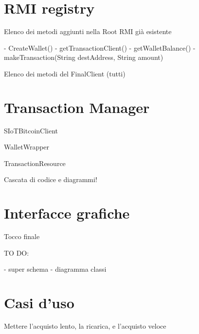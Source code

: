 \section{RMI registry}
\label{c:integr:rmi}

Elenco dei metodi aggiunti nella Root RMI già esistente

- CreateWallet()
- getTransactionClient()
- getWalletBalance()
- makeTransaction(String destAddress, String amount)

Elenco dei metodi del FinalClient (tutti)

\section{Transaction Manager}
\label{c:integr:trxmanager}

SIoTBitcoinClient

WalletWrapper

TransactionResource


Cascata di codice e diagrammi!

\section{Interfacce grafiche}
\label{c:integr:gui}

Tocco finale

TO DO:

- super schema
- diagramma classi

\section{Casi d'uso}
\label{c:integr:useCase}

Mettere l'acquisto lento, la ricarica, e l'acquisto veloce
